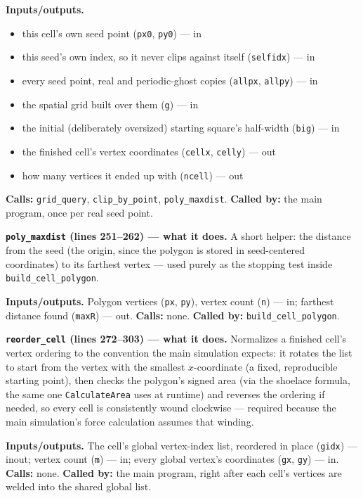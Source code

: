 \documentclass[11pt]{article}
\begin{document}
\textbf{Inputs/outputs.}
\begin{itemize}[nosep]
  \item this cell's own seed point (\texttt{px0}, \texttt{py0}) --- in
  \item this seed's own index, so it never clips against itself (\texttt{selfidx}) --- in
  \item every seed point, real and periodic-ghost copies (\texttt{allpx}, \texttt{allpy}) --- in
  \item the spatial grid built over them (\texttt{g}) --- in
  \item the initial (deliberately oversized) starting square's half-width (\texttt{big}) --- in
  \item the finished cell's vertex coordinates (\texttt{cellx}, \texttt{celly}) --- out
  \item how many vertices it ended up with (\texttt{ncell}) --- out
\end{itemize}

\textbf{Calls:} \texttt{grid\_query}, \texttt{clip\_by\_point}, \texttt{poly\_maxdist}.
\textbf{Called by:} the main program, once per real seed point.

\textbf{\texttt{poly\_maxdist} (lines 251--262) --- what it does.} A short helper: the
distance from the seed (the origin, since the polygon is stored in seed-centered
coordinates) to its farthest vertex --- used purely as the stopping test inside
\texttt{build\_cell\_polygon}.

\textbf{Inputs/outputs.} Polygon vertices (\texttt{px}, \texttt{py}), vertex count
(\texttt{n}) --- in; farthest distance found (\texttt{maxR}) --- out. \textbf{Calls:}
none. \textbf{Called by:} \texttt{build\_cell\_polygon}.

\textbf{\texttt{reorder\_cell} (lines 272--303) --- what it does.} Normalizes a
finished cell's vertex ordering to the convention the main simulation expects: it
rotates the list to start from the vertex with the smallest $x$-coordinate (a fixed,
reproducible starting point), then checks the polygon's signed area (via the shoelace
formula, the same one \texttt{CalculateArea} uses at runtime) and reverses the ordering
if needed, so every cell is consistently wound clockwise --- required because the main
simulation's force calculation assumes that winding.

\textbf{Inputs/outputs.} The cell's global vertex-index list, reordered in place
(\texttt{gidx}) --- inout; vertex count (\texttt{m}) --- in; every global vertex's
coordinates (\texttt{gx}, \texttt{gy}) --- in. \textbf{Calls:} none. \textbf{Called
by:} the main program, right after each cell's vertices are welded into the shared
global list.
\end{document}
